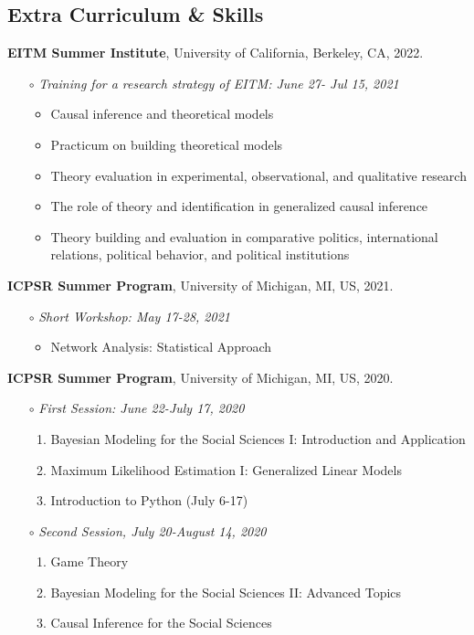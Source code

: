 \documentclass[margin,line]{res}
\begin{document}
\begin{resume}
\section{\sc Extra Curriculum \& Skills} 

{\bf EITM Summer Institute}, University of California, Berkeley, CA, 2022.
\vspace{-.4cm}
\begin{itemize} \itemsep -1mm 
	\item[$\circ$] \textit{Training for a research strategy of EITM: June 27- Jul 15, 2021}
	\begin{itemize} \itemsep -1mm 
		\item Causal inference and theoretical models 
		\item Practicum on building theoretical models
		\item Theory evaluation in experimental, observational, and qualitative research 
		\item The role of theory and identification in generalized causal inference   
		\item Theory building and evaluation in comparative politics, international relations, political behavior, and political institutions 
	\end{itemize}
\end{itemize}
\vspace{-.25cm}
{\bf ICPSR Summer Program}, University of Michigan, MI, US, 2021.
\vspace{-.4cm}
\begin{itemize} \itemsep -1mm 
	\item[$\circ$] \textit{Short Workshop: May 17-28, 2021}
	\begin{itemize} \itemsep -1mm 
		\item Network Analysis: Statistical Approach
	\end{itemize}
\end{itemize}
\vspace{-.25cm}
{\bf ICPSR Summer Program}, University of Michigan, MI, US, 2020.
\vspace{-.4cm}
\begin{itemize} \itemsep -1mm 
	\item[$\circ$] \textit{First Session: June 22-July 17, 2020}
	\begin{enumerate} \itemsep -1mm 
		\item Bayesian Modeling for the Social Sciences I: Introduction and Application
		\item Maximum Likelihood Estimation I: Generalized Linear Models
		\item Introduction to Python (July 6-17)
	\end{enumerate}
	\item[$\circ$] \textit{Second Session, July 20-August 14, 2020}
	\begin{enumerate} \itemsep -1mm 
		\item Game Theory
		\item Bayesian Modeling for the Social Sciences II: Advanced Topics
		\item Causal Inference for the Social Sciences
	\end{enumerate}
\end{itemize}


\end{resume}
\end{document}
